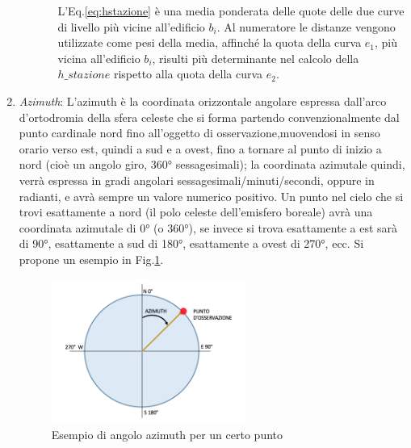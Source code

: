 \begin{enumerate}
\begin{enumerate}
\begin{itemize}
L'Eq.\ref{eq:hstazione} è una media ponderata delle quote delle due curve di livello più vicine all'edificio $b_i$. Al numeratore le distanze vengono utilizzate come pesi della media, affinché la quota della curva $e_1$, più vicina all'edificio $b_i$, risulti più determinante nel calcolo della $h\_stazione$ rispetto alla quota della curva $e_2$.
\end{itemize}
\end{enumerate}

\item \textit{Azimuth}:
L'azimuth è la coordinata orizzontale angolare espressa dall'arco d'ortodromia della sfera celeste che si forma partendo convenzionalmente dal punto cardinale nord fino all'oggetto di osservazione,muovendosi in senso orario verso est, quindi a sud e a ovest, fino a tornare al punto di inizio a nord (cioè un angolo giro, 360° sessagesimali); la coordinata azimutale quindi, verrà espressa in gradi angolari sessagesimali/minuti/secondi, oppure in radianti, e avrà sempre un valore numerico positivo. Un punto nel cielo che si trovi esattamente a nord (il polo celeste dell'emisfero boreale) avrà una coordinata azimutale di 0° (o 360°), se invece si trova esattamente a est sarà di 90°, esattamente a sud di 180°, esattamente a ovest di 270°, ecc. Si propone un esempio in Fig.\ref{fig:azimuth}.

\begin{figure}[bth]
  \centering
    \includegraphics[width=0.6\textwidth]{img/azimuth}
      \caption{Esempio di angolo azimuth per un certo punto}
       \label{fig:azimuth}
\end{figure}




\end{enumerate}
